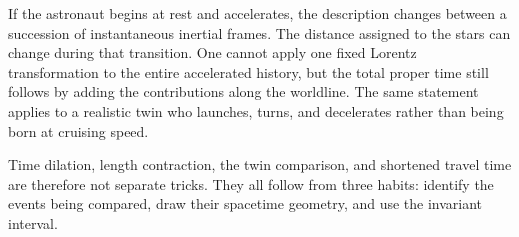 If the astronaut begins at rest and accelerates, the description changes
between a succession of instantaneous inertial frames. The distance assigned
to the stars can change during that transition. One cannot apply one fixed
Lorentz transformation to the entire accelerated history, but the total
proper time still follows by adding the contributions along the worldline.
The same statement applies to a realistic twin who launches, turns, and
decelerates rather than being born at cruising speed.

\begin{classroomqa}
\end{classroomqa}

Time dilation, length contraction, the twin comparison, and shortened travel
time are therefore not separate tricks. They all follow from three habits:
identify the events being compared, draw their spacetime geometry, and use the
invariant interval.
